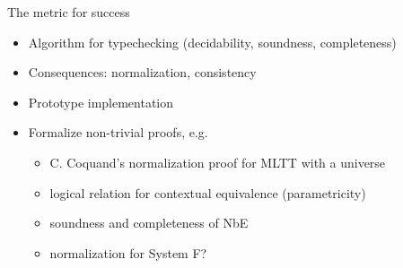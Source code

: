 \documentclass[usenames,dvipsnames]{beamer}
\begin{document}
\begin{frame}{The metric for success}
\begin{itemize}
\item Algorithm for typechecking (decidability, soundness, completeness)
\item Consequences: normalization, consistency
\item Prototype implementation
\item Formalize non-trivial proofs, e.g.
\begin{itemize}
\item C. Coquand's normalization proof for MLTT with a universe
\item logical relation for contextual equivalence (parametricity)
\item soundness and completeness of NbE
\item normalization for System F?
\end{itemize}
\end{itemize}
\end{frame}
\end{document}
